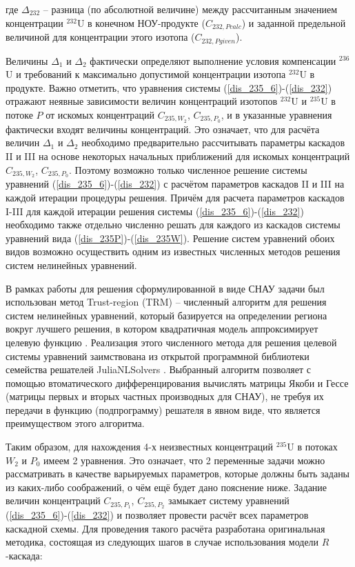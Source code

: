 где $\Delta_{232}$ -- разница (по абсолютной величине) между рассчитанным значением концентрации $^{232}$U в конечном НОУ-продукте ($C_{232,P\textit{calc}}$) и заданной предельной величиной для концентрации этого изотопа ($C_{232,P\textit{given}}$).

Величины $\Delta_{1}$ и $\Delta_{2}$ фактически определяют выполнение условия компенсации $^{236}$U и требований к максимально допустимой концентрации изотопа $^{232}$U в продукте. Важно отметить, что уравнения системы (\ref{dis_235_6})-(\ref{dis_232}) отражают неявные зависимости величин концентраций изотопов $^{232}$U и $^{235}$U в потоке $P$ от искомых концентраций $C_{235,{W_2}}$, $C_{235,{P_0}}$, и в указанные уравнения фактически входят величины концентраций. Это означает, что для расчёта величин $\Delta_{1}$ и $\Delta_{2}$ необходимо предварительно рассчитывать параметры каскадов II и III на основе некоторых начальных приближений для искомых концентраций $C_{235,{W_2}}$, $C_{235,{P_0}}$. Поэтому возможно только численное решение системы уравнений (\ref{dis_235_6})-(\ref{dis_232}) с расчётом параметров каскадов II и III на каждой итерации процедуры решения. Причём для расчета параметров каскадов I-III для каждой итерации решения системы (\ref{dis_235_6})-(\ref{dis_232}) необходимо также отдельно численно решать для каждого из каскадов системы уравнений вида (\ref{dis_235P})-(\ref{dis_235W}). Решение систем уравнений обоих видов возможно осуществить одним из известных численных методов решения систем нелинейных уравнений. 

В рамках работы для решения сформулированной в виде СНАУ задачи был использован метод Trust-region (TRM) -- численный алгоритм для решения систем нелинейных уравнений, который базируется на определении региона вокруг лучшего решения, в котором квадратичная модель аппроксимирует целевую функцию \cite{NumericalOptimization2006}. Реализация этого численного метода для решения целевой системы уравнений заимствована из открытой программной библиотеки семейства решателей JuliaNLSolvers \cite{mogensenJuliaNLSolversNLsolveJl2020,Optim.jl-2018}. Выбранный алгоритм позволяет с помощью втоматического дифференцирования вычислять матрицы Якоби и Гессе (матрицы первых и вторых частных производных для СНАУ), не требуя их передачи в функцию (подпрограмму) решателя в явном виде, что является преимуществом этого алгоритма.


Таким образом, для нахождения 4-х неизвестных концентраций $^{235}$U в потоках $W_2$ и $P_0$ имеем 2 уравнения. Это означает, что 2 переменные задачи можно рассматривать в качестве варьируемых параметров, которые должны быть заданы из каких-либо соображений, о чём ещё будет дано пояснение ниже. Задание величин концентраций $C_{235,{P_1}}$, $C_{235,{P_2}}$ замыкает систему уравнений (\ref{dis_235_6})-(\ref{dis_232}) и позволяет провести расчёт всех параметров каскадной схемы. Для проведения такого расчёта разработана оригинальная методика, состоящая из следующих шагов в случае использования модели $R$-каскада:

